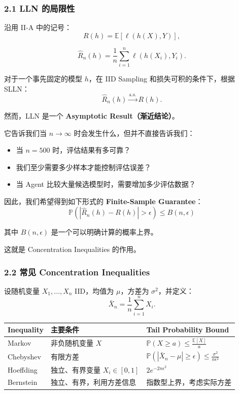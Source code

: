 \hypertarget{part-2-14-0001-lln-ux7684ux5c40ux9650ux6027}{%
\subsubsection{2.1 LLN 的局限性}\label{part-2-14-0001-lln-ux7684ux5c40ux9650ux6027}}

沿用 II-A 中的记号：
\[R(h)=\mathbb E[\ell(h(X),Y)],\]

\[\widehat R_n(h)
=
\frac1n\sum_{i=1}^{n}\ell(h(X_i),Y_i).\]

对于一个事先固定的模型 \(h\)，在 IID Sampling 和损失可积的条件下，根据 SLLN：
\[\widehat R_n(h)
\xrightarrow{\mathrm{a.s.}}
R(h).\]

然而，LLN 是一个 \textbf{Asymptotic Result（渐近结论）}。

它告诉我们当 \(n\to\infty\) 时会发生什么，但并不直接告诉我们：

\begin{itemize}
\tightlist
\item
  当 \(n=500\) 时，评估结果有多可靠？
\item
  我们至少需要多少样本才能控制评估误差？
\item
  当 Agent 比较大量候选模型时，需要增加多少评估数据？
\end{itemize}

因此，我们希望得到如下形式的 \textbf{Finite-Sample Guarantee}：
\[\boxed{
\mathbb P
\left(
|\widehat R_n(h)-R(h)|>\epsilon
\right)
\leq B(n,\epsilon)
}\]

其中 \(B(n,\epsilon)\) 是一个可以明确计算的概率上界。

这就是 Concentration Inequalities 的作用。

\hypertarget{part-2-14-0001-ux5e38ux89c1-concentration-inequalities}{%
\subsubsection{2.2 常见 Concentration Inequalities}\label{part-2-14-0001-ux5e38ux89c1-concentration-inequalities}}

设随机变量 \(X_1,\ldots,X_n\) IID，均值为 \(\mu\)，方差为 \(\sigma^2\)，并定义：
\[\bar X_n=\frac1n\sum_{i=1}^{n}X_i.\]

\begin{readertable}
\begin{longtable}[]{@{}
  >{\raggedright\arraybackslash}p{}
  >{\raggedright\arraybackslash}p{}
  >{\raggedright\arraybackslash}p{}@{}}
\toprule
Inequality & 主要条件 & Tail Probability Bound \\
\midrule
\endhead
Markov & 非负随机变量 \(X\) & \(\mathbb P(X\geq a)\leq\frac{\mathbb E[X]}a\) \\
Chebyshev & 有限方差 & \(\mathbb P(|\bar X_n-\mu|\geq\epsilon)\leq\frac{\sigma^2}{n\epsilon^2}\) \\
Hoeffding & 独立、有界变量 \(X_i\in[0,1]\) & \(2e^{-2n\epsilon^2}\) \\
Bernstein & 独立、有界，利用方差信息 & 指数型上界，考虑实际方差 \\
\bottomrule
\end{longtable}
\end{readertable}

